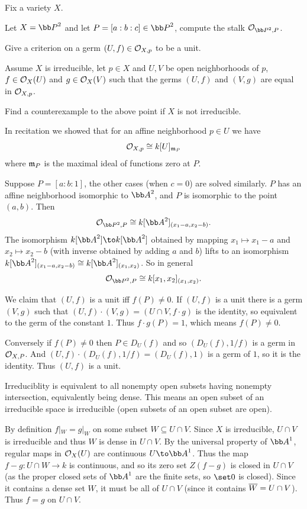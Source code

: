 \bprob

    Fix a variety $X$.
    \benum
        \item Let $X=\bP^2$ and let $P=[a:b:c]\in\bP^2$, compute the stalk $\O_{\bP^2,P}$.
        \item Give a criterion on a germ $(U,f)\in{{\cal O}}_{X,p}$ to be a unit.
        \item Assume $X$ is irreducible, let $p\in X$ and $U,V$ be open neighborhoods of $p$, $f\in{{\cal O}}_X(U)$ and $g\in{{\cal O}}_X(V)$ such that
        the germs $(U,f)$ and $(V,g)$ are equal in ${{\cal O}}_{X,p}$.
        \item Find a counterexample to the above point if $X$ is not irreducible.
    \eenum

\eprob

\benum
    \item In recitation we showed that for an affine neighborhood $p\in U$ we have
    $$ {{\cal O}}_{X,p} \cong k[U]_{{{\frak m}}_P} $$
    where ${{\frak m}}_P$ is the maximal ideal of functions zero at $P$.

    Suppose $P=[a:b:1]$, the other cases (when $c=0$) are solved similarly.
    $P$ has an affine neighborhood isomorphic to $\bA^2$, and $P$ is isomorphic to the point $(a,b)$.
    Then
    $$ \O_{\bP^2,P} \cong k[\bA^2]_{(x_1-a,x_2-b)} . $$
    The isomorphism $k[\bA^2]\to k[\bA^2]$ obtained by mapping $x_1\mapsto x_1-a$ and $x_2\mapsto x_2-b$ (with inverse obtained by adding $a$
    and $b$) lifts to an isomorphism $k[\bA^2]_{(x_1-a,x_2-b)}\cong k[\bA^2]_{(x_1,x_2)}$.
    So in general
    $$ \O_{\bP^2,P} \cong k[x_1,x_2]_{(x_1,x_2)} . $$

    \item We claim that $(U,f)$ is a unit iff $f(P)\neq0$.
    If $(U,f)$ is a unit there is a germ $(V,g)$ such that $(U,f)\cdot(V,g)=(U\cap V,f\cdot g)$ is the identity, so equivalent to the germ of 
    the constant $1$.
    Thus $f\cdot g(P)=1$, which means $f(P)\neq0$.

    Conversely if $f(P)\neq0$ then $P\in D_U(f)$ and so $(D_U(f),1/f)$ is a germ in ${{\cal O}}_{X,P}$.
    And $(U,f)\cdot(D_U(f),1/f)=(D_U(f),1)$ is a germ of $1$, so it is the identity.
    Thus $(U,f)$ is a unit.

    \item Irreduciblity is equivalent to all nonempty open subsets having nonempty intersection, equivalently being dense.
    This means an open subset of an irreducible space is irreducible (open subsets of an open subset are open).

    By definition $f|_W=g|_W$ on some subset $W\subseteq U\cap V$.
    Since $X$ is irreducible, $U\cap V$ is irreducible and thus $W$ is dense in $U\cap V$.
    By the universal property of $\bA^1$, regular maps in ${{\cal O}}_X(U)$ are continuous $U\to\bA^1$.
    Thus the map $f-g\colon U\cap W\to k$ is continuous, and so its zero set $Z(f-g)$ is closed in $U\cap V$ (as the proper closed sets of $\bA^1$
    are the finite sets, so $\set0$ is closed).
    Since it contains a dense set $W$, it must be all of $U\cap V$ (since it contains ${\overline{W}}=U\cap V$).
    Thus $f=g$ on $U\cap V$.

